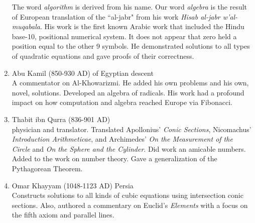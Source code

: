 \documentclass[12pt]{article}
\begin{document}
\begin{enumerate}
 The word \textit{algorithm} is derived from his name. Our word \textit{algebra} is the result of European translation of the ``al-jabr" from his work \textit{Hisab al-jabr w'al-muqabala}. His work is the first known Arabic work that included the Hindu base-10, positional numerical system. It does not appear that zero held a position equal to the other 9 symbols. He demonstrated solutions to all types of quadratic equations and gave proofs of their correctness.
 \vfill
 \item Abu Kamil (850-930 AD) of Egyptian descent\\
 A commentator on Al-Khowarizmi. He added his own problems and his own, novel, solutions. Developed an algebra of radicals. His work had a profound impact on how computation and algebra reached Europe via Fibonacci.
 \vfill
 \item Thabit ibn Qurra (836-901 AD) \\
 physician and translator. Translated Apollonius' \textit{Conic Sections}, Nicomachus' \textit{Introduction Arithmeticae}, and Archimedes' \textit{On the Measurement of the Circle} and \textit{On the Sphere and the Cylinder}. Did work an amicable numbers. Added to the work on number theory. Gave a generalization of the Pythagorean Theorem.\\
 
 \item Omar Khayyam (1048-1123 AD) Persia\\
 Constructs solutions to all kinds of cubic equations using intersection conic sections. Also, authored a commentary on Euclid's \textit{Elements} with a focus on the fifth axiom and parallel lines.
 \vfill
 \end{enumerate}
\end{document}
